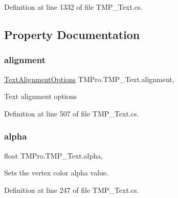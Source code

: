 Definition at line 1332 of file T\+M\+P\+\_\+\+Text.\+cs.



\subsection{Property Documentation}
\mbox{\label{class_t_m_pro_1_1_t_m_p___text_aca3d7496b6d7fc7792f6f560180a09c8}} 
\subsubsection{\texorpdfstring{alignment}{alignment}}
{\footnotesize\ttfamily \mbox{\hyperlink{namespace_t_m_pro_a1dd743b58b1fd4057c00e4b98ab86301}{Text\+Alignment\+Options}} T\+M\+Pro.\+T\+M\+P\+\_\+\+Text.\+alignment\hspace{0.3cm}{\ttfamily [get]}, {\ttfamily [set]}}



Text alignment options 



Definition at line 507 of file T\+M\+P\+\_\+\+Text.\+cs.

\mbox{\label{class_t_m_pro_1_1_t_m_p___text_aca56e662ce122bb749faa1b044f29a57}} 
\subsubsection{\texorpdfstring{alpha}{alpha}}
{\footnotesize\ttfamily float T\+M\+Pro.\+T\+M\+P\+\_\+\+Text.\+alpha\hspace{0.3cm}{\ttfamily [get]}, {\ttfamily [set]}}



Sets the vertex color alpha value. 



Definition at line 247 of file T\+M\+P\+\_\+\+Text.\+cs.

\mbox{\label{class_t_m_pro_1_1_t_m_p___text_ad7272d3ca6e85d57f3a28b625b532207}} 
